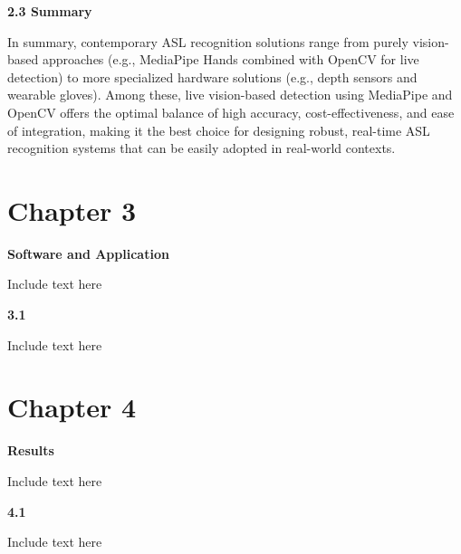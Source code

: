 \documentclass[12pt]{article}
\begin{document}
\vspace{1.5em}
\noindent
\textbf{2.3 Summary}
\vspace{1em}

In summary, contemporary ASL recognition solutions range from purely vision-based 
approaches (e.g., MediaPipe Hands combined with OpenCV for live detection) to more 
specialized hardware solutions (e.g., depth sensors and wearable gloves). Among these, live 
vision-based detection using MediaPipe and OpenCV offers the optimal balance of high 
accuracy, cost-effectiveness, and ease of integration, making it the best choice for designing 
robust, real-time ASL recognition systems that can be easily adopted in real-world contexts.


\newpage
\section*{Chapter 3}
\begin{center}
\large \textbf{Software and Application}
\end{center}

Include text here

\vspace{1.5em}
\noindent
\textbf{3.1 }
\vspace{1.5em}

Include text here

\newpage
\section*{Chapter 4}
\begin{center}
\large \textbf{Results}
\end{center}

Include text here

\vspace{1.5em}
\noindent
\textbf{4.1 }
\vspace{1.5em}

Include text here

\newpage
\end{document}
